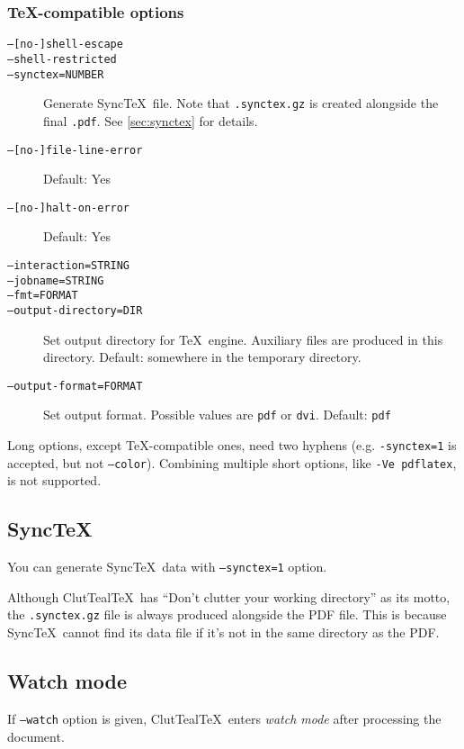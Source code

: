 \documentclass[a4paper, 11pt]{scrartcl}
\newcommand\CluttealTeX{ClutTeal\TeX\xspace}
\newcommand\metavar[1]{\textnormal{\textsf{#1}}}
\begin{document}
\subsubsection{\TeX-compatible options}
\begin{description}
\item[\texttt{--[no-]shell-escape}]
\item[\texttt{--shell-restricted}]
\item[\texttt{--synctex=\metavar{NUMBER}}]
  Generate Sync\TeX\ file.
  Note that \texttt{.synctex.gz} is created alongside the final \texttt{.pdf}.
  See \autoref{sec:synctex} for details.
\item[\texttt{--[no-]file-line-error}]
  Default: Yes
\item[\texttt{--[no-]halt-on-error}]
  Default: Yes
\item[\texttt{--interaction=\metavar{STRING}}]
\item[\texttt{--jobname=\metavar{STRING}}]
\item[\texttt{--fmt=\metavar{FORMAT}}]
\item[\texttt{--output-directory=\metavar{DIR}}]
  Set output directory for \TeX\ engine.
  Auxiliary files are produced in this directory.
  Default: somewhere in the temporary directory.
\item[\texttt{--output-format=\metavar{FORMAT}}]
  Set output format.
  Possible values are \texttt{pdf} or \texttt{dvi}.
  Default: \texttt{pdf}
\end{description}

Long options, except \TeX-compatible ones, need two hyphens (e.g. \texttt{-synctex=1} is accepted, but not \texttt{--color}).
Combining multiple short options, like \texttt{-Ve pdflatex}, is not supported.

\subsection{Sync\TeX}\label{sec:synctex}
You can generate Sync\TeX\ data with \texttt{--synctex=1} option.

Although \CluttealTeX\ has \enquote{Don't clutter your working directory} as its motto, the \texttt{.synctex.gz} file is always produced alongside the PDF file.
This is because Sync\TeX\ cannot find its data file if it's not in the same directory as the PDF.

\subsection{Watch mode}\label{sec:watch-mode}
If \texttt{--watch} option is given, \CluttealTeX\ enters \emph{watch mode} after processing the document.
\end{document}
